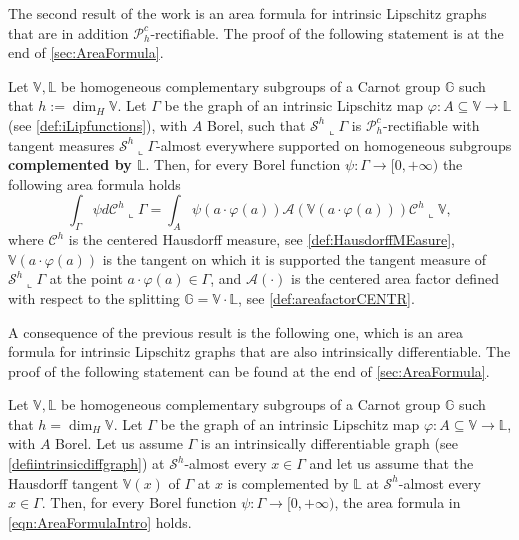 \documentclass[10pt, a4paper,
oneside, headinclude,footinclude]{scrartcl}
\begin{document}
The second result of the work is an area formula for intrinsic Lipschitz graphs that are in addition $\mathscr{P}_h^c$-rectifiable. The proof of the following statement is at the end of \cref{sec:AreaFormula}.
\begin{teorema}\label{thm:AREAINTRO1}
Let $\mathbb V,\mathbb L$ be homogeneous complementary subgroups of a Carnot group $\mathbb G$ such that $h:=\dim_H\mathbb V$. Let $\Gamma$ be the graph of an intrinsic Lipschitz map $\varphi:A\subseteq\mathbb V\to\mathbb L$ (see \cref{def:iLipfunctions}), with $A$ Borel, such that $\mathcal{S}^h\llcorner\Gamma$ is $\mathscr{P}_h^c$-rectifiable with tangent measures $\mathcal{S}^h\llcorner\Gamma$-almost everywhere supported on homogeneous subgroups \textbf{complemented by $\mathbb L$}. Then, for every Borel function $\psi:\Gamma\to[0,+\infty)$ the following area formula holds
\begin{equation}\label{eqn:AreaFormulaIntro}
\int_\Gamma \psi d\mathcal{C}^h\llcorner\Gamma = \int_A \psi(a\cdot\varphi(a))\mathcal{A}(\mathbb V(a\cdot\varphi(a)))\mathcal{C}^h\llcorner\mathbb V,
\end{equation}
where $\mathcal{C}^h$ is the centered Hausdorff measure, see \cref{def:HausdorffMEasure}, $\mathbb V(a\cdot\varphi(a))$ is the tangent on which it is supported the tangent measure of $\mathcal{S}^h\llcorner\Gamma$ at the point $a\cdot\varphi(a)\in\Gamma$, and $\mathcal{A}(\cdot)$ is the centered area factor defined with respect to the splitting $\mathbb G=\mathbb V\cdot\mathbb L$, see \cref{def:areafactorCENTR}.
\end{teorema}


A consequence of the previous result is the following one, which is an area formula for intrinsic Lipschitz graphs that are also intrinsically differentiable. The proof of the following statement can be found at the end of \cref{sec:AreaFormula}.

\begin{teorema}\label{thm:AREAINTRO2}
Let $\mathbb V,\mathbb L$ be homogeneous complementary subgroups of a Carnot group $\mathbb G$ such that $h=\dim_H\mathbb V$. Let $\Gamma$ be the graph of an intrinsic Lipschitz map $\varphi:A\subseteq\mathbb V\to\mathbb L$, with $A$ Borel. Let us assume $\Gamma$ is an intrinsically differentiable graph (see \cref{defiintrinsicdiffgraph}) at $\mathcal{S}^h$-almost every $x\in\Gamma$ and let us assume that the Hausdorff tangent $\mathbb V(x)$ of $\Gamma$ at $x$ is complemented by $\mathbb L$ at $\mathcal{S}^h$-almost every $x\in\Gamma$. Then, for every Borel function $\psi:\Gamma\to[0,+\infty)$, the area formula in \eqref{eqn:AreaFormulaIntro} holds.
\end{teorema}
\end{document}
